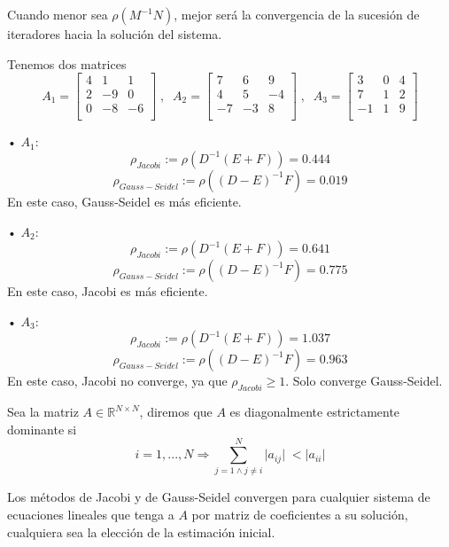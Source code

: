 \begin{nprop}
Cuando menor sea $\rho (M^{-1}N)$, mejor será la convergencia de la sucesión de iteradores hacia la solución del sistema.
\end{nprop}

\begin{ejemplo}
Tenemos dos matrices
\[
A_1 = \begin{bmatrix}
4 & 1 & 1 \\
2 & -9 & 0 \\
0 & -8 & -6 \\
\end{bmatrix}
\; , \; \;
A_2 = \begin{bmatrix}
7 & 6 & 9 \\
4 & 5 & -4 \\
-7 & -3 & 8 \\
\end{bmatrix}
\; , \; \;
A_3 = \begin{bmatrix}
3 & 0 & 4 \\
7 & 1 & 2 \\
-1 & 1 & 9 \\
\end{bmatrix}
\]
	\begin{nlist}
	\item[•] $A_1$:
	\[ \rho _{Jacobi} := \rho (D^{-1}(E+F)) = 0.444 \]
	\[ \rho _{Gauss-Seidel} := \rho ((D-E)^{-1}F) = 0.019 \]
	En este caso, Gauss-Seidel es más eficiente.
	\item[•] $A_2$:
	\[ \rho _{Jacobi} := \rho (D^{-1}(E+F)) = 0.641 \]
	\[ \rho _{Gauss-Seidel} := \rho ((D-E)^{-1}F) = 0.775 \]
	En este caso, Jacobi es más eficiente.
	\item[•] $A_3$:
	\[ \rho _{Jacobi} := \rho (D^{-1}(E+F)) = 1.037 \]
	\[ \rho _{Gauss-Seidel} := \rho ((D-E)^{-1}F) = 0.963 \]
	En este caso, Jacobi no converge, ya que $\rho _{Jacobi} \geq 1$. Solo converge Gauss-Seidel.
	\end{nlist}
\end{ejemplo}

\begin{ndef}
Sea la matriz $A \in \mathbb{R}^{N \times N}$, diremos que $A$ es diagonalmente estrictamente dominante si
\[ i = 1,...,N \Rightarrow \sum_{j=1 \wedge j \neq i}^N \vert a_{ij} \vert \; < \vert a_{ii} \vert \]
\end{ndef}

Los métodos de Jacobi y de Gauss-Seidel convergen para cualquier sistema de ecuaciones lineales que tenga a $A$ por matriz de coeficientes a su solución, cualquiera sea la elección de la estimación inicial.

